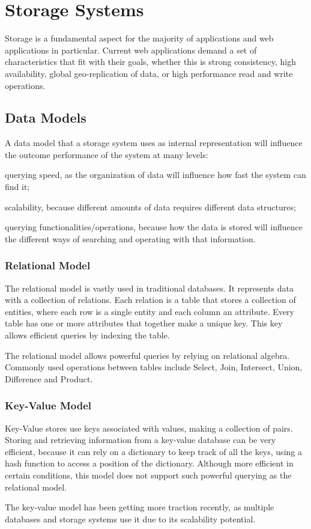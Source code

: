 \section{Storage Systems}
\label{sec:storage_systems}
Storage is a fundamental aspect for the majority of applications and web applications in particular. Current web applications demand a set of characteristics that fit with their goals, whether this is strong consistency, high availability, global geo-replication of data, or high performance read and write operations.

\subsection{Data Models}
\label{sec:data_models}
A data model that a storage system uses as internal representation will influence the outcome performance of the system at many levels: \begin{enumerate*}[(i)]
	\item querying speed, as the organization of data will influence how fast the system can find it;
	\item scalability, because different amounts of data requires different data structures;
	\item querying functionalities/operations, because how the data is stored will influence the different ways of searching and operating with that information.
\end{enumerate*}

\subsubsection{Relational Model}
\label{sec:relational_model}
The relational model\cite{relational_model} is vastly used in traditional databases. It represents data with a collection of relations. Each relation is a table that stores a collection of entities, where each row is a single entity and each column an attribute. Every table has one or more attributes that together make a unique key. This key allows efficient queries by indexing the table.\par
	The relational model allows powerful queries by relying on relational algebra. Commonly used operations between tables include Select, Join, Intersect, Union, Difference and Product.

\subsubsection{Key-Value Model}
\label{sec:key-value_model}
Key-Value stores use keys associated with values, making a collection of pairs. Storing and retrieving information from a key-value database can be very efficient, because it can rely on a dictionary to keep track of all the keys, using a hash function to access a position of the dictionary. Although more efficient in certain conditions, this model does not support such powerful querying as the relational model.\par
	The key-value model has been getting more traction recently, as multiple databases and storage systems use it due to its scalability potential.
	
